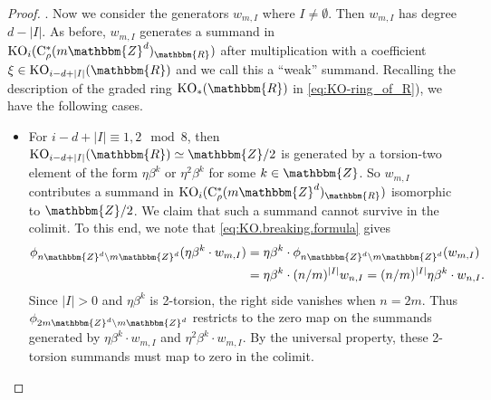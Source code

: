 \documentclass{amsart}
\numberwithin{figure}{section}
\numberwithin{equation}{section}
\numberwithin{table}{section}
\theoremstyle{plain}
\theoremstyle{definition}
\theoremstyle{remark}
\theoremstyle{nonumber}
\newcommand{\Z}{\mathbb{Z}}
\newcommand{\R}{\mathbb{R}}
\newcommand{\KO}{\relax\ifmmode\operatorname{KO}\else\textup{KO}\fi}
\newcommand{\Cst}{\relax\ifmmode\mathrm{C}^*\else\textup{C*}\fi}
\newcommand{\Cstr}{\Cst_\rho} %
\renewcommand{\mathbb}{\mathbbm} %
\begin{document}
\begin{proof}
.
Now we consider the generators \( w_{m,I} \) where 
\(I\neq \emptyset\). Then \( w_{m,I} \) has degree
$d-|I|$. As before, \( w_{m,I} \) generates a summand in \(
\KO_i(\Cstr(m\Z^d)_{\R}) \) after multiplication with a coefficient \(
\xi\in\KO_{i-d+|I|}(\R) \) and we call this a ``weak'' summand.
Recalling the description of the graded ring $\KO_*(\R)$ in \eqref{eq:KO-ring_of_R}), we have the following cases. 
\begin{itemize}
\item 
For \( i-d+|I|\equiv 1,2\mod 8 \), then \( \KO_{i-d+|I|}(\R)\simeq\Z/2 \)
is generated by a torsion-two element of the form \( \eta\beta^k \)
or \( \eta^2\beta^k \) for some \( k\in\Z \).
So $w_{m,I}$ contributes a summand in \( \KO_i(\Cstr(m\Z^d)_{\R}) \)
isomorphic to \( \Z/2 \). We claim that such a
summand cannot survive in the colimit. 
To this end, we note that \eqref{eq:KO.breaking.formula} gives
\begin{equation}\label{eq:KO.weak.breaking.formula}
\begin{aligned}
  \phi_{n\Z^d\backslash m\Z^d}(\eta\beta^k\cdot
  w_{m,I})&=\eta\beta^k\cdot\phi_{n\Z^d\backslash m\Z^d}(w_{m,I})\\ 
  &=\eta\beta^k\cdot
  (n/m)^{|I|}w_{n,I}=(n/m)^{|I|}\eta\beta^k\cdot w_{n,I}.
\end{aligned}
\end{equation}
Since $|I|>0$ and $\eta\beta^k$ is 2-torsion, 
the right side vanishes when $n=2m$.
Thus \( \phi_{2m\Z^d\backslash m\Z^d} \) restricts to the zero map on the summands generated by \( \eta\beta^k\cdot w_{m,I} \)
and \( \eta^2\beta^k\cdot w_{m,I} \).
By the universal property, these 2-torsion summands must map to zero in the
colimit.


\end{itemize}
\end{proof}
\end{document}
